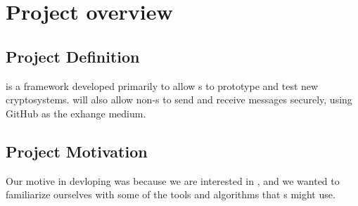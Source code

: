 \section{Project overview}


\subsection{Project Definition}
\cry{} is a framework developed primarily to allow
\cg{}s to prototype and test new cryptosystems. \cry{} will
also allow non-\cg{}s to send and receive messages
securely, using GitHub as the exhange medium.

\subsection{Project Motivation}
Our motive in devloping \cry{} was because we are interested
in \cgy{}, and we wanted to familiarize ourselves with
some of the tools and algorithms that \cg{}s might use.

